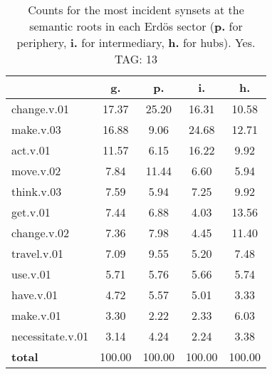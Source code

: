 \begin{table}[h!]
\begin{center}
\begin{tabular}{| l | c | c | c | c |}\hline
 & g. & p. & i. & h. \\\hline
change.v.01 & 17.37  & 25.20  & 16.31  & 10.58 \\\hline
make.v.03 & 16.88  & 9.06  & 24.68  & 12.71 \\\hline
act.v.01 & 11.57  & 6.15  & 16.22  & 9.92 \\\hline
move.v.02 & 7.84  & 11.44  & 6.60  & 5.94 \\\hline
think.v.03 & 7.59  & 5.94  & 7.25  & 9.92 \\\hline
get.v.01 & 7.44  & 6.88  & 4.03  & 13.56 \\\hline
change.v.02 & 7.36  & 7.98  & 4.45  & 11.40 \\\hline
travel.v.01 & 7.09  & 9.55  & 5.20  & 7.48 \\\hline
use.v.01 & 5.71  & 5.76  & 5.66  & 5.74 \\\hline
have.v.01 & 4.72  & 5.57  & 5.01  & 3.33 \\\hline
make.v.01 & 3.30  & 2.22  & 2.33  & 6.03 \\\hline
necessitate.v.01 & 3.14  & 4.24  & 2.24  & 3.38 \\\hline
{{\bf total}} & 100.00  & 100.00  & 100.00  & 100.00 \\\hline
\end{tabular}
\caption{Counts for the most incident synsets at the semantic roots in each Erd\"os sector ({\bf p.} for periphery, {\bf i.} for intermediary, {\bf h.} for hubs). Yes. TAG: 13}
\end{center}
\end{table}